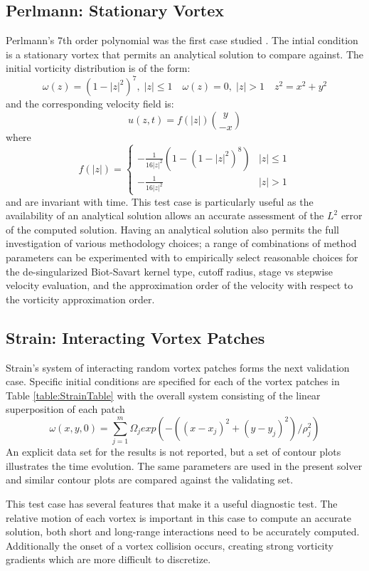 \documentclass[letterpaper,12pt]{report}
\newcommand{\ben}[1]{\begin{equation}\label{#1}}
\newcommand{\ee}{\end{equation}}
\begin{document}
\subsection{Perlmann: Stationary Vortex}
Perlmann's 7th order polynomial was the first case studied \cite{Perlmann1985}. The intial condition is a stationary vortex that permits an analytical solution to compare against. The initial vorticity distribution is of the form:
\ben{PerlW} \omega(z)=(1-|z|^2)^7, \; |z|\leq 1  \quad \omega(z)=0, \;|z|>1 \quad z^2=x^2+y^2 \ee
and the corresponding velocity field is:
\ben{PerlU} u(z,t)=f(|z|)\binom{y}{-x} \ee
where
\[
f(|z|)=
\begin{cases}
    -\frac{1}{16|z|^2}(1-(1-|z|^2)^8)	& |z| \leq 1\\
    -\frac{1}{16|z|^2} 			& |z|>1
\end{cases}
\]
and are invariant with time. This test case is particularly useful as the availability of an analytical solution allows an accurate assessment of the $L^2$ error of the computed solution. Having an analytical solution also permits the full investigation of various methodology choices; a range of combinations of method parameters can be experimented with to empirically select reasonable choices for the de-singularized Biot-Savart kernel type, cutoff radius, stage vs stepwise velocity evaluation, and the approximation order of the velocity with respect to the vorticity approximation order.

\subsection{Strain: Interacting Vortex Patches}
Strain's system of interacting random vortex patches \cite{Strain1996} forms the next validation case. Specific initial conditions are specified for each of the vortex patches in Table \ref{table:StrainTable} with the overall system consisting of the linear superposition of each patch
\ben{StrainV} \omega(x,y,0) = \sum_{j=1}^m \Omega_j exp(-((x-x_j)^2 + (y-y_j)^2)/\rho_j^2) \ee
An explicit data set for the results is not reported, but a set of contour plots illustrates the time evolution. The same parameters are used in the present solver and similar contour plots are compared against the validating set.

This test case has several features that make it a useful diagnostic test. The relative motion of each vortex is important in this case to compute an accurate solution, both short and long-range interactions need to be accurately computed. Additionally the onset of a vortex collision occurs, creating strong vorticity gradients which are more difficult to discretize.
\end{document}
